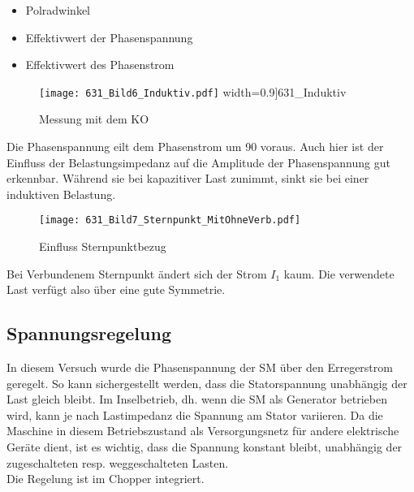\begin{flushleft}
\begin{itemize}
\item \makebox[5cm][l]{$\varphi = 0.6\degree$  }            Polradwinkel
\item {}         Effektivwert der Phasenspannung
\item {}        Effektivwert des Phasenstrom    
\end{itemize}

\vspace{0.2cm}

\begin{figure}[H]
\centering
        \texttt{[image: 631\_Bild6\_Induktiv.pdf]}
				width=0.9\textwidth]{631_Induktiv}
    \caption{Messung mit dem KO}
    \label{fig:U/I_L}
\end{figure}

Die Phasenspannung eilt dem Phasenstrom um 90 \degree voraus. Auch hier ist der Einfluss der Belastungsimpedanz auf die Amplitude der Phasenspannung gut erkennbar. Während sie bei kapazitiver Last zunimmt, sinkt sie bei einer induktiven Belastung. \\

\begin{figure}[H]
    \centering
        \texttt{[image: 631\_Bild7\_Sternpunkt\_MitOhneVerb.pdf]}
    \caption{Einfluss Sternpunktbezug}
    \label{fig:EinflussSternpunktL}
\end{figure}
Bei Verbundenem Sternpunkt ändert sich der Strom $I_1$ kaum. Die verwendete Last verfügt also über eine gute Symmetrie.




\newpage
\subsection{Spannungsregelung}

In diesem Versuch wurde die Phasenspannung der SM über den Erregerstrom geregelt. So kann sichergestellt werden, dass die Statorspannung unabhängig der Last gleich bleibt.
Im Inselbetrieb, dh. wenn die SM als Generator betrieben wird, kann je nach Lastimpedanz die Spannung am Stator variieren. Da die Maschine in diesem Betriebszustand als Versorgungsnetz für andere elektrische Geräte dient, ist es wichtig, dass die Spannung konstant bleibt, unabhängig der zugeschalteten resp. weggeschalteten Lasten.\\
Die Regelung ist im Chopper integriert. \\


\end{flushleft}
